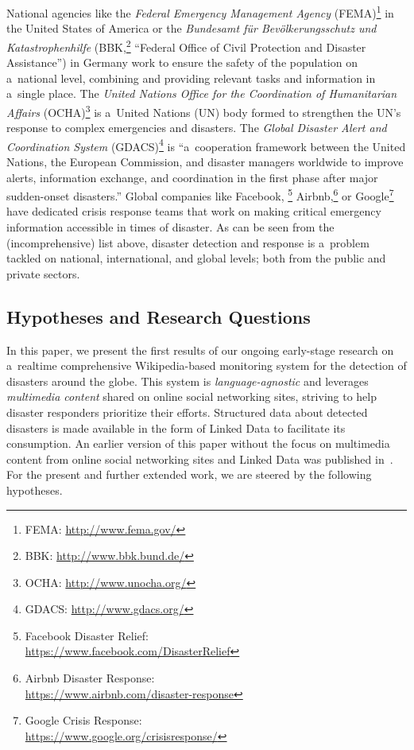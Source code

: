 \documentclass[letterpaper]{article}
\begin{document}
National agencies like the
\emph{Federal Emergency Management Agency}
(FEMA)\footnote{FEMA: \url{http://www.fema.gov/}}
in the United States of America or the
\emph{Bundesamt für Bevölkerungsschutz und Katastrophenhilfe}
(BBK,\footnote{BBK: \url{http://www.bbk.bund.de/}}
``Federal Office of Civil Protection and Disaster Assistance'')
in Germany work to ensure the safety of the population
on a~national level, combining and providing relevant tasks
and information in a~single place.
The \emph{United Nations Office for the Coordination of Humanitarian Affairs}
(OCHA)\footnote{OCHA: \url{http://www.unocha.org/}}
is a~United Nations (UN) body formed to strengthen the UN's response
to complex emergencies and disasters.
The \emph{Global Disaster Alert and Coordination System}
(GDACS)\footnote{GDACS: \url{http://www.gdacs.org/}}
is ``a~cooperation framework between the United Nations,
the European Commission, and disaster managers worldwide
to improve alerts, information exchange, and coordination
in the first phase after major sudden-onset disasters.''
Global companies like Facebook,%
\footnote{Facebook Disaster Relief:\\\null\hspace{2em}
\url{https://www.facebook.com/DisasterRelief}}
Airbnb,\footnote{Airbnb Disaster Response:\\\null\hspace{2em}
\url{https://www.airbnb.com/disaster-response}} or
Google\footnote{Google Crisis Response:\\\null\hspace{2em}
\url{https://www.google.org/crisisresponse/}}
have dedicated crisis response teams that work on
making critical emergency information accessible in times of disaster.
As can be seen from the (incomprehensive) list above,
disaster detection and response is a~problem
tackled on national, international, and global levels;
both from the public and private sectors.

\subsection{Hypotheses and Research Questions}

In this paper, we present the first results of
our ongoing early-stage research
on a~realtime comprehensive Wikipedia-based monitoring system
for the detection of disasters around the globe.
This system is \emph{language-agnostic} and leverages
\emph{multimedia content} shared on online social networking sites,
striving to help disaster responders prioritize their efforts.
Structured data about detected disasters is made available
in the form of Linked Data to facilitate its consumption.
An earlier version of this paper without the focus
on multimedia content from online social networking sites and Linked Data
was published in~\cite{steiner2014disaster}.
For the present and further extended work, we are steered by the following hypotheses.
\end{document}
